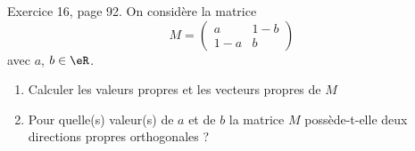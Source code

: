\begin{exercice}\label{exoLineraire0039}

	Exercice 16, page 92. On considère la matrice
	\begin{equation}
		M=\begin{pmatrix}
			a	&	1-b	\\ 
			1-a	&	b	
		\end{pmatrix}
	\end{equation}
	avec $a$, $b\in\eR$.
	\begin{enumerate}

		\item
			Calculer les valeurs propres et les vecteurs propres de $M$
		\item
			Pour quelle(s) valeur(s) de $a$ et de $b$ la matrice $M$ possède-t-elle deux directions propres orthogonales ?

	\end{enumerate}

\end{exercice}
